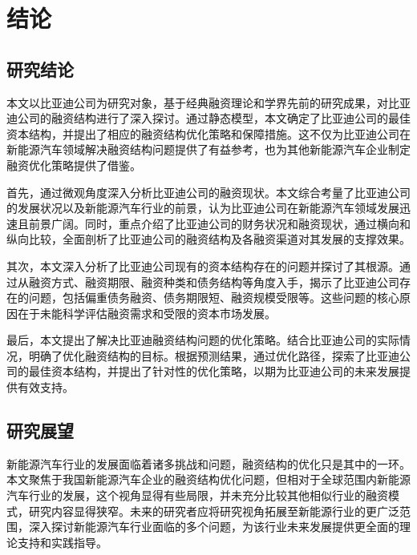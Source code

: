\chapter{结论}
\section{研究结论}
本文以比亚迪公司为研究对象，基于经典融资理论和学界先前的研究成果，对比亚迪公司的融资结构进行了深入探讨。通过静态模型，本文确定了比亚迪公司的最佳资本结构，并提出了相应的融资结构优化策略和保障措施。这不仅为比亚迪公司在新能源汽车领域解决融资结构问题提供了有益参考，也为其他新能源汽车企业制定融资优化策略提供了借鉴。

首先，通过微观角度深入分析比亚迪公司的融资现状。本文综合考量了比亚迪公司的发展状况以及新能源汽车行业的前景，认为比亚迪公司在新能源汽车领域发展迅速且前景广阔。同时，重点介绍了比亚迪公司的财务状况和融资现状，通过横向和纵向比较，全面剖析了比亚迪公司的融资结构及各融资渠道对其发展的支撑效果。

其次，本文深入分析了比亚迪公司现有的资本结构存在的问题并探讨了其根源。通过从融资方式、融资期限、融资种类和债务结构等角度入手，揭示了比亚迪公司存在的问题，包括偏重债务融资、债务期限短、融资规模受限等。这些问题的核心原因在于未能科学评估融资需求和受限的资本市场发展。

最后，本文提出了解决比亚迪融资结构问题的优化策略。结合比亚迪公司的实际情况，明确了优化融资结构的目标。根据预测结果，通过优化路径，探索了比亚迪公司的最佳资本结构，并提出了针对性的优化策略，以期为比亚迪公司的未来发展提供有效支持。

\section{研究展望}
新能源汽车行业的发展面临着诸多挑战和问题，融资结构的优化只是其中的一环。本文聚焦于我国新能源汽车企业的融资结构优化问题，但相对于全球范围内新能源汽车行业的发展，这个视角显得有些局限，并未充分比较其他相似行业的融资模式，研究内容显得狭窄。未来的研究者应将研究视角拓展至新能源行业的更广泛范围，深入探讨新能源汽车行业面临的多个问题，为该行业未来发展提供更全面的理论支持和实践指导。